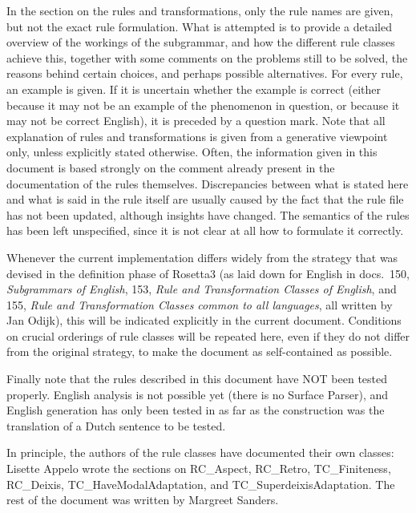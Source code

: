 In the section on the rules and transformations, only the rule names are given, 
but not the exact rule formulation. What is attempted 
is to provide a detailed overview of the workings of the subgrammar, and 
how the different rule classes achieve this,
together with some comments on the problems still to be solved, the reasons 
behind certain choices, and perhaps possible alternatives. For every rule, an 
example is given. If it is uncertain whether the example is correct (either 
because it may not be an example of the phenomenon in question, or because it 
may not be correct English), it is preceded by a question mark. Note that all 
explanation of rules and transformations is given from a generative viewpoint
only, unless explicitly stated otherwise. Often, the information given in this 
document is based strongly on the comment already present in the documentation 
of the rules themselves. Discrepancies between what is stated here and what is 
said in the rule itself are usually caused by the fact that the rule file has 
not  been updated, although insights have changed. The semantics of the rules 
has been left unspecified, since it is not clear at all how to formulate it 
correctly.

Whenever the current implementation differs widely from the strategy that was 
devised in the definition phase of Rosetta3 (as laid down for English in docs.\ 
150, {\em Subgrammars of English\/}, 153, {\em Rule and Transformation Classes 
of English\/}, and 155, {\em Rule and Transformation Classes common to all 
languages\/}, all written by Jan Odijk), this will be indicated explicitly in 
the current document. Conditions on crucial orderings of rule classes will be 
repeated here, even if they do not differ from the original strategy, to make 
the document as self-contained as possible.

Finally note that the rules described in this document have NOT been tested 
properly. English analysis is not possible yet (there is no Surface Parser), and 
English generation has only been tested in as far as the construction was the 
translation of a Dutch sentence to be tested.

In principle, the authors of the rule classes have documented their own 
classes: Lisette Appelo wrote the sections on 
RC\_Aspect, RC\_Retro, TC\_Finiteness, RC\_Deixis, TC\_HaveModalAdaptation,
and TC\_SuperdeixisAdaptation. The rest of the document was written by Margreet 
Sanders.


 \newpage
